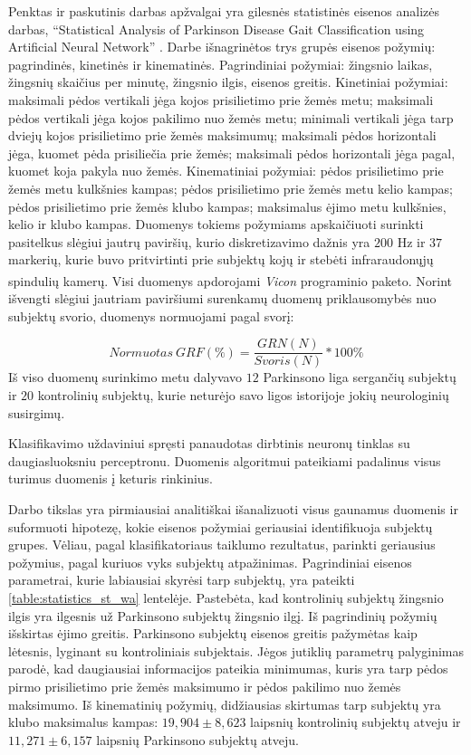 \documentclass[]{vgtuef}
\begin{document}
Penktas ir paskutinis darbas apžvalgai yra gilesnės statistinės eisenos analizės darbas, ``Statistical Analysis of Parkinson Disease Gait Classification using Artificial Neural Network'' \cite{6151536}. Darbe išnagrinėtos trys grupės eisenos požymių: pagrindinės, kinetinės ir kinematinės. Pagrindiniai požymiai: žingsnio laikas, žingsnių skaičius per minutę, žingsnio ilgis, eisenos greitis. Kinetiniai požymiai: maksimali pėdos vertikali jėga kojos prisilietimo prie žemės metu; maksimali pėdos vertikali jėga kojos pakilimo nuo žemės metu; minimali vertikali jėga tarp dviejų kojos prisilietimo prie žemės maksimumų; maksimali pėdos horizontali jėga, kuomet pėda prisiliečia prie žemės; maksimali pėdos horizontali jėga pagal, kuomet koja pakyla nuo žemės. Kinematiniai požymiai: pėdos prisilietimo prie žemės metu kulkšnies kampas; pėdos prisilietimo prie žemės metu kelio kampas; pėdos prisilietimo prie žemės klubo kampas; maksimalus ėjimo metu kulkšnies, kelio ir klubo kampas. Duomenys tokiems požymiams apskaičiuoti surinkti pasitelkus slėgiui jautrų paviršių, kurio diskretizavimo dažnis yra $200$ Hz ir $37$ markerių, kurie buvo pritvirtinti prie subjektų kojų ir stebėti infraraudonųjų spindulių kamerų. Visi duomenys apdorojami \textit{Vicon\textsuperscript{\textregistered}} programinio paketo. Norint išvengti slėgiui jautriam paviršiumi surenkamų duomenų priklausomybės nuo subjektų svorio, duomenys normuojami pagal svorį:

\begin{equation}
Normuotas~GRF(\%) = \frac{GRN(N)}{Svoris (N)} * 100\%
\end{equation}
Iš viso duomenų surinkimo metu dalyvavo $12$ Parkinsono liga sergančių subjektų ir $20$ kontrolinių subjektų, kurie neturėjo savo ligos istorijoje jokių neurologinių susirgimų.

Klasifikavimo uždaviniui spręsti panaudotas dirbtinis neuronų tinklas su daugiasluoksniu perceptronu. Duomenis algoritmui pateikiami padalinus visus turimus duomenis į keturis rinkinius.

Darbo tikslas yra pirmiausiai analitiškai išanalizuoti visus gaunamus duomenis ir suformuoti hipotezę, kokie eisenos požymiai geriausiai identifikuoja subjektų grupes. Vėliau, pagal klasifikatoriaus taiklumo rezultatus, parinkti geriausius požymius, pagal kuriuos vyks subjektų atpažinimas. Pagrindiniai eisenos parametrai, kurie labiausiai skyrėsi tarp subjektų, yra pateikti \ref{table:statistics_st_wa} lentelėje. Pastebėta, kad kontrolinių subjektų žingsnio ilgis yra ilgesnis už Parkinsono subjektų žingsnio ilgį. Iš pagrindinių požymių išskirtas ėjimo greitis. Parkinsono subjektų eisenos greitis pažymėtas kaip lėtesnis, lyginant su kontroliniais subjektais. Jėgos jutiklių parametrų palyginimas parodė, kad daugiausiai informacijos pateikia minimumas, kuris yra tarp pėdos pirmo prisilietimo prie žemės maksimumo ir pėdos pakilimo nuo žemės maksimumo. Iš kinematinių požymių, didžiausias skirtumas tarp subjektų yra klubo maksimalus kampas: $19,904\pm8,623$ laipsnių kontrolinių subjektų atveju ir $11,271\pm6,157$ laipsnių Parkinsono subjektų atveju.
\end{document}
